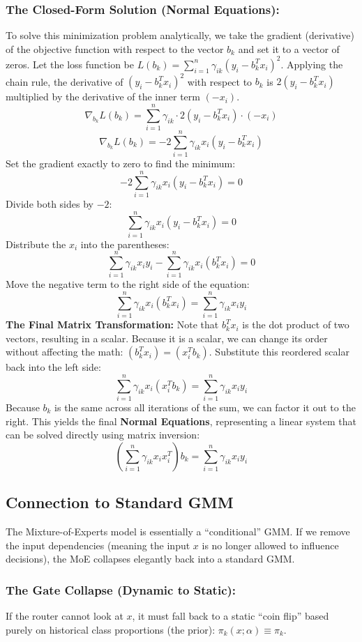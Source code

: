\documentclass[twoside, 10pt]{article}
\begin{document}
\subsubsection{The Closed-Form Solution (Normal Equations):}
To solve this minimization problem analytically, we take the gradient (derivative) of the objective function with respect to the vector $b_k$ and set it to a vector of zeros.
Let the loss function be $L(b_k) = \sum_{i=1}^n \gamma_{ik} (y_i - b_k^T x_i)^2$. Applying the chain rule, the derivative of $(y_i - b_k^T x_i)^2$ with respect to $b_k$ is $2(y_i - b_k^T x_i)$ multiplied by the derivative of the inner term $(-x_i)$.
\[
\nabla_{b_k} L(b_k) = \sum_{i=1}^n \gamma_{ik} \cdot 2(y_i - b_k^T x_i) \cdot (-x_i)
\]
\[
\nabla_{b_k} L(b_k) = -2 \sum_{i=1}^n \gamma_{ik} x_i (y_i - b_k^T x_i)
\]
Set the gradient exactly to zero to find the minimum:
\[
-2 \sum_{i=1}^n \gamma_{ik} x_i (y_i - b_k^T x_i) = 0
\]
Divide both sides by $-2$:
\[
\sum_{i=1}^n \gamma_{ik} x_i (y_i - b_k^T x_i) = 0
\]
Distribute the $x_i$ into the parentheses:
\[
\sum_{i=1}^n \gamma_{ik} x_i y_i - \sum_{i=1}^n \gamma_{ik} x_i (b_k^T x_i) = 0
\]
Move the negative term to the right side of the equation:
\[
\sum_{i=1}^n \gamma_{ik} x_i (b_k^T x_i) = \sum_{i=1}^n \gamma_{ik} x_i y_i
\]
\textbf{The Final Matrix Transformation:} Note that $b_k^T x_i$ is the dot product of two vectors, resulting in a scalar. Because it is a scalar, we can change its order without affecting the math: $(b_k^T x_i) = (x_i^T b_k)$. Substitute this reordered scalar back into the left side:
\[
\sum_{i=1}^n \gamma_{ik} x_i (x_i^T b_k) = \sum_{i=1}^n \gamma_{ik} x_i y_i
\]
Because $b_k$ is the same across all iterations of the sum, we can factor it out to the right. This yields the final \textbf{Normal Equations}, representing a linear system that can be solved directly using matrix inversion:
\[
\left( \sum_{i=1}^n \gamma_{ik} x_i x_i^T \right) b_k = \sum_{i=1}^n \gamma_{ik} x_i y_i
\]
\subsection{Connection to Standard GMM}
The Mixture-of-Experts model is essentially a ``conditional'' GMM. If we remove the input dependencies (meaning the input $x$ is no longer allowed to influence decisions), the MoE collapses elegantly back into a standard GMM.
\subsubsection{The Gate Collapse (Dynamic to Static):}
If the router cannot look at $x$, it must fall back to a static ``coin flip'' based purely on historical class proportions (the prior): $\pi_k(x; \alpha) \equiv \pi_k$.
\end{document}

